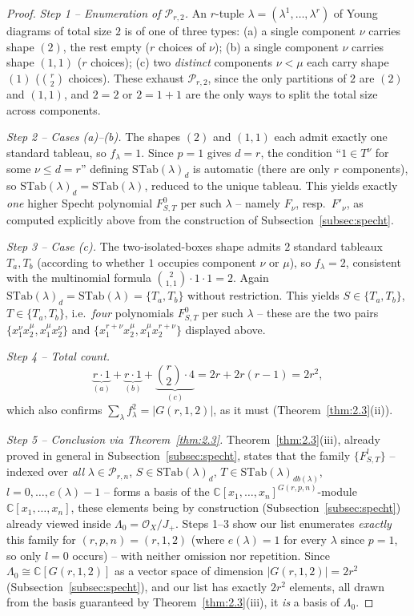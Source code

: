 \documentclass[11pt,a4paper]{article}
\begin{document}
\begin{proof}
\emph{Step 1 -- Enumeration of $\mathcal{P}_{r,2}$.} An $r$-tuple
$\lambda=(\lambda^1,\dots,\lambda^r)$ of Young diagrams of total size
$2$ is of one of three types: (a) a single component $\nu$ carries
shape $(2)$, the rest empty ($r$ choices of $\nu$); (b) a single
component $\nu$ carries shape $(1,1)$ ($r$ choices); (c) two
\emph{distinct} components $\nu < \mu$ each carry shape $(1)$
($\binom{r}{2}$ choices). These exhaust $\mathcal{P}_{r,2}$, since the
only partitions of $2$ are $(2)$ and $(1,1)$, and $2=2$ or $2=1+1$ are
the only ways to split the total size across components.

\emph{Step 2 -- Cases (a)--(b).} The shapes $(2)$ and $(1,1)$ each
admit exactly one standard tableau, so $f_\lambda = 1$. Since $p=1$
gives $d=r$, the condition ``$1 \in T^\nu$ for some $\nu \le d=r$''
defining $\mathrm{STab}(\lambda)_d$ is automatic (there are only $r$
components), so $\mathrm{STab}(\lambda)_d = \mathrm{STab}(\lambda)$,
reduced to the unique tableau. This yields exactly \emph{one} higher
Specht polynomial $F^0_{S,T}$ per such $\lambda$ -- namely $F_\nu$,
resp.\ $F'_\nu$, as computed explicitly above from the construction of
Subsection~\ref{subsec:specht}.

\emph{Step 3 -- Case (c).} The two-isolated-boxes shape admits $2$
standard tableaux $T_a,T_b$ (according to whether $1$ occupies
component $\nu$ or $\mu$), so $f_\lambda = 2$, consistent with the
multinomial formula $\binom{2}{1,1}\cdot 1\cdot 1 = 2$. Again
$\mathrm{STab}(\lambda)_d = \mathrm{STab}(\lambda) = \{T_a,T_b\}$
without restriction. This yields $S \in \{T_a,T_b\}$,
$T \in \{T_a,T_b\}$, i.e.\ \emph{four} polynomials $F^0_{S,T}$ per such
$\lambda$ -- these are the two pairs
$\{x_1^\nu x_2^\mu, x_1^\mu x_2^\nu\}$ and
$\{x_1^{r+\nu}x_2^\mu, x_1^\mu x_2^{r+\nu}\}$ displayed above.

\emph{Step 4 -- Total count.}
\[
  \underbrace{r \cdot 1}_{(a)} + \underbrace{r \cdot 1}_{(b)}
  + \underbrace{\binom{r}{2}\cdot 4}_{(c)}
  = 2r + 2r(r-1) = 2r^2,
\]
which also confirms $\sum_\lambda f_\lambda^2 = |G(r,1,2)|$, as it
must (Theorem~\ref{thm:2.3}(ii)).

\emph{Step 5 -- Conclusion via Theorem~\ref{thm:2.3}.}
Theorem~\ref{thm:2.3}(iii), already proved in general in
Subsection~\ref{subsec:specht}, states that the family $\{F^l_{S,T}\}$ -- indexed over
\emph{all} $\lambda \in \mathcal{P}_{r,n}$,
$S \in \mathrm{STab}(\lambda)_d$, $T \in \mathrm{STab}(\lambda)_{db(\lambda)}$,
$l = 0,\dots,e(\lambda)-1$ -- forms a basis of the
$\mathbb{C}[x_1,\dots,x_n]^{G(r,p,n)}$-module
$\mathbb{C}[x_1,\dots,x_n]$, these elements being by construction
(Subsection~\ref{subsec:specht}) already viewed inside $\Lambda_0 = \mathcal{O}_X/J_+$.
Steps 1--3 show our list enumerates \emph{exactly} this family for
$(r,p,n)=(r,1,2)$ (where $e(\lambda)=1$ for every $\lambda$ since
$p=1$, so only $l=0$ occurs) -- with neither omission nor repetition.
Since $\Lambda_0 \cong \mathbb{C}[G(r,1,2)]$ as a vector space of
dimension $|G(r,1,2)| = 2r^2$ (Subsection~\ref{subsec:specht}), and our list has
exactly $2r^2$ elements, all drawn from the basis guaranteed by
Theorem~\ref{thm:2.3}(iii), it \emph{is} a basis of $\Lambda_0$.
\end{proof}
\end{document}
